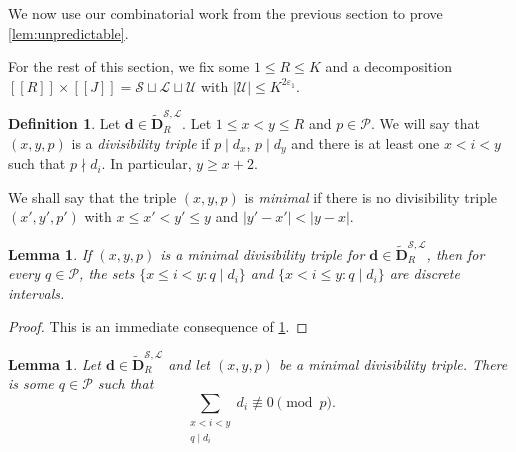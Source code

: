 \documentclass[11pt]{amsart}
\newtheorem{lemma}[theorem]{Lemma}
\theoremstyle{definition}
\newtheorem{definition}[theorem]{Definition}
\renewcommand{\leq}{\leqslant}
\renewcommand{\geq}{\geqslant}
\newcommand{\sinterval}[1]{[\![#1]\!] }
\newcommand{\abs}[1]{\left|#1\right|}
\newcommand{\eps}{\varepsilon}
\newcommand{\primes}{\mathcal{P}}
\renewcommand{\d}{\boldsymbol{d}}
\newcommand{\cstU}{2\eps_1}
\newcommand{\lit}{\mathcal{L}}
\newcommand{\unlit}{\mathcal{U}}
\newcommand{\s}{\mathcal{S}}
\newcommand{\fancyD}{\mathbf{D}}
\newcommand{\Dnb}{\widetilde{\fancyD}^{\s,\lit}_{\!\tupsize}}
\newcommand{\repK}{K}
\newcommand{\newR}{\sinterval{J}}
\newcommand{\tupsize}{R}
\newcommand{\thisx}{x}
\newcommand{\thisy}{y}
\begin{document}
We now use our combinatorial work from the previous section to prove \cref{lem:unpredictable}.

For the rest of this section, we fix some $1\leq \tupsize\leq \repK$ and a decomposition ${\sinterval{\tupsize}\times \newR = \s\sqcup\lit\sqcup\unlit}$ with $|\unlit| \leq\repK^{\cstU}$.

\begin{definition}
\label{def:minimalrep}
Let $\d\in \Dnb$. Let $1\leq \thisx<\thisy \leq \tupsize$ and $p\in \primes$. We will say that $(\thisx,\thisy,p)$ is a \emph{divisibility triple} if $p\mid d_\thisx$, $p\mid d_\thisy$ and there is at least one $\thisx<i<\thisy$ such that $p\nmid d_i$. In particular, $\thisy\geq \thisx+2$. 

We shall say that the triple $(\thisx,\thisy,p)$ is \emph{minimal} if there is no divisibility triple $(\thisx',\thisy',p')$ with ${\thisx\leq \thisx'<\thisy'\leq \thisy}$ and $\abs{\thisy'-\thisx'}<\abs{\thisy-\thisx}$.
\end{definition}

\begin{lemma}
\label{lem:triplediscreteintervals}
If $(\thisx,\thisy,p)$ is a minimal divisibility triple for $\d\in \Dnb$, then for every $q\in \primes$, the sets $\{x\leq i<y : q\mid d_i\}$ and $\{x< i \leq y : q\mid d_i\}$ are discrete intervals.
\end{lemma}
\begin{proof}
This is an immediate consequence of \cref{def:minimalrep}.
\end{proof}

\begin{lemma}
\label{lem:seprepstep0}
Let $\d\in \Dnb$ and let $(\thisx,\thisy,p)$ be a minimal divisibility triple. There is some $q\in \primes$ such that 
\begin{equation*}
	\sum_{\substack{\thisx<i<\thisy\\ q\mid d_{i}}} d_{i} \not\equiv 0 \pmod p.
\end{equation*}
\end{lemma}
\end{document}

